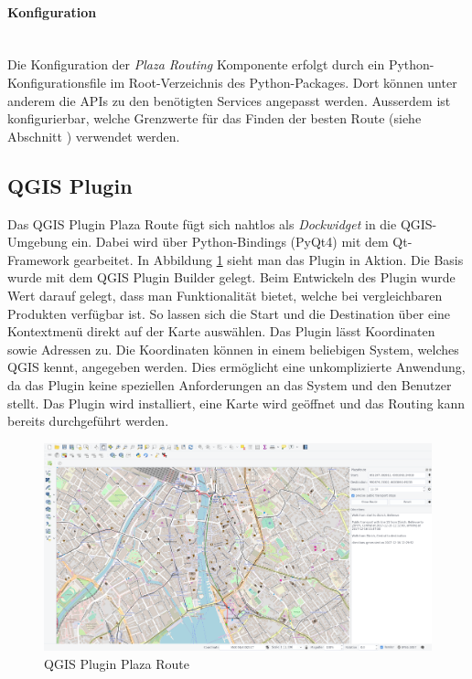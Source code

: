 \paragraph{Konfiguration}\label{impl:PlazaRouting_Konfiguration}~\\
Die Konfiguration der \emph{Plaza Routing} Komponente erfolgt durch ein Python-Konfigurationsfile im Root-Verzeichnis des Python-Packages. Dort können unter anderem die \ac{API}s zu den benötigten Services angepasst werden. Ausserdem ist konfigurierbar, welche Grenzwerte für das Finden der besten Route (siehe Abschnitt ) verwendet werden.

\subsection{QGIS Plugin}
\label{impl:QGIS Plugin}
Das QGIS Plugin Plaza Route \cite{github:PlazaRoute-qgis-plugin} fügt sich nahtlos als \emph{Dockwidget} in die QGIS-Umgebung ein. Dabei wird über Python-Bindings (PyQt4) mit dem Qt-Framework gearbeitet. In Abbildung \ref{fig:qgis_plugin_plaza_route} sieht man das Plugin in Aktion. Die Basis wurde mit dem QGIS Plugin Builder \cite{qgis_plugin_builder} gelegt. Beim Entwickeln des Plugin wurde Wert darauf gelegt, dass man Funktionalität bietet, welche bei vergleichbaren Produkten verfügbar ist. So lassen sich die Start und die Destination über eine Kontextmenü direkt auf der Karte auswählen. Das Plugin lässt Koordinaten sowie Adressen zu. Die Koordinaten können in einem beliebigen System, welches QGIS kennt, angegeben werden. Dies ermöglicht eine unkomplizierte Anwendung, da das Plugin keine speziellen Anforderungen an das System und den Benutzer stellt. Das Plugin wird installiert, eine Karte wird geöffnet und das Routing kann bereits durchgeführt werden.

\begin{figure}[ht]
\centering
\includegraphics[width=1.0\linewidth]{projectdoc/img/qgis_plugin_plaza_route}
\caption[QGIS Plugin Plaza Route]{QGIS Plugin Plaza Route}
\label{fig:qgis_plugin_plaza_route}
\end{figure}

